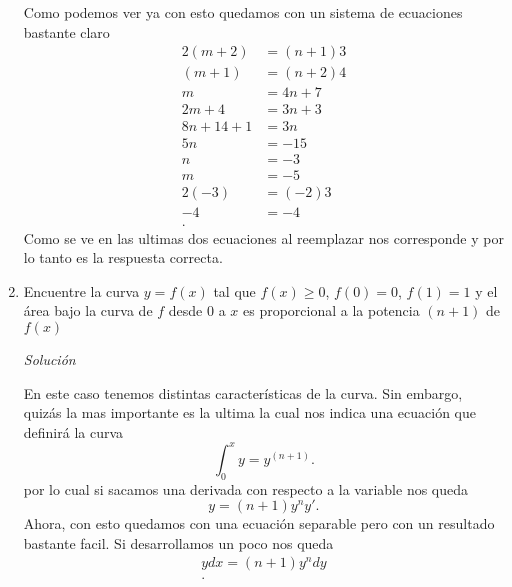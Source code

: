 \begin{enumerate}
	Como podemos ver ya con esto quedamos con un sistema de ecuaciones bastante claro
	\begin{align*}
	  2\left( m+2 \right) &= \left( n+1 \right) 3 \\
	  \left( m+1 \right) &= \left( n+2 \right) 4 \\
	  m &= 4n + 7 \\
	  2m + 4 &= 3n + 3 \\
	  8n + 14 + 1 &= 3n \\
	  5n &= -15 \\
	  n &= -3 \\
	  m &= -5 \\
	  2(-3) &= (-2)3 \\
	  -4 &= -4 \\
	.\end{align*}
	Como se ve en las ultimas dos ecuaciones al reemplazar nos corresponde y por lo tanto es la respuesta correcta.
      \item Encuentre la curva $y = f\left( x \right) $ tal que $f\left( x \right) \ge 0$, $f\left( 0 \right) = 0$, $f\left( 1 \right) = 1$ y el área bajo la curva de $f$ desde $0$ a $x$ es proporcional a la potencia $\left( n+1 \right) $ de $f\left( x \right) $

	\textit{Solución}

	En este caso tenemos distintas características de la curva. Sin embargo, quizás la mas importante es la ultima la cual nos indica una ecuación que definirá la curva \[
	\int_0^x y = y^{\left( n+1 \right) }
	.\] por lo cual si sacamos una derivada con respecto a la variable nos queda \[
	y = \left( n+1 \right) y^{n} y'
	.\] Ahora, con esto quedamos con una ecuación separable pero con un resultado bastante facil. Si desarrollamos un poco nos queda
	\begin{align*}
	  ydx = \left( n+1 \right) y^{n}dy\\
	.\end{align*}
    \end{enumerate}

